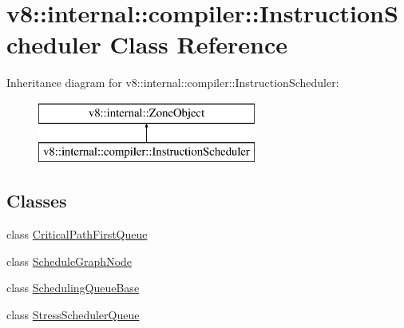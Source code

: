 \hypertarget{classv8_1_1internal_1_1compiler_1_1_instruction_scheduler}{}\section{v8\+:\+:internal\+:\+:compiler\+:\+:Instruction\+Scheduler Class Reference}
\label{classv8_1_1internal_1_1compiler_1_1_instruction_scheduler}
Inheritance diagram for v8\+:\+:internal\+:\+:compiler\+:\+:Instruction\+Scheduler\+:\begin{figure}[H]
\begin{center}
\leavevmode
\includegraphics[height=2.000000cm]{classv8_1_1internal_1_1compiler_1_1_instruction_scheduler}
\end{center}
\end{figure}
\subsection*{Classes}
\begin{DoxyCompactItemize}
\item 
class \hyperlink{classv8_1_1internal_1_1compiler_1_1_instruction_scheduler_1_1_critical_path_first_queue}{Critical\+Path\+First\+Queue}
\item 
class \hyperlink{classv8_1_1internal_1_1compiler_1_1_instruction_scheduler_1_1_schedule_graph_node}{Schedule\+Graph\+Node}
\item 
class \hyperlink{classv8_1_1internal_1_1compiler_1_1_instruction_scheduler_1_1_scheduling_queue_base}{Scheduling\+Queue\+Base}
\item 
class \hyperlink{classv8_1_1internal_1_1compiler_1_1_instruction_scheduler_1_1_stress_scheduler_queue}{Stress\+Scheduler\+Queue}
\end{DoxyCompactItemize}
